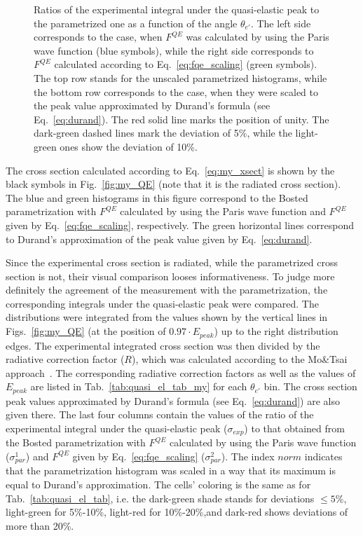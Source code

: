 \begin{figure}[htp]
\begin{center}
\begin{framed}
\end{framed}
\caption{\small Ratios of the experimental integral under the quasi-elastic peak to the parametrized one as a function of the angle $\theta_{e'}$. The left side corresponds to the case, when $F^{QE}$ was calculated by using the Paris wave function (blue symbols), while the right side corresponds to $F^{QE}$ calculated according to Eq.~\eqref{eq:fqe_scaling} (green symbols). The top row stands for the unscaled parametrized histograms, while the bottom row corresponds to the case, when they were scaled to the peak value approximated by Durand's formula (see Eq.~\eqref{eq:durand}). The red solid line marks the position of unity. The dark-green dashed lines mark the deviation of 5\%, while the light-green ones show the deviation of 10\%.} \label{fig:my_ratio}
\end{center}
\end{figure}

The cross section calculated according to Eq.~\eqref{eq:my_xsect} is shown by the black symbols in Fig.~\ref{fig:my_QE} (note that it is the radiated cross section). The blue and green histograms in this figure correspond to the Bosted parametrization with  $F^{QE}$ calculated by using the Paris wave function and $F^{QE}$ given by Eq.~\eqref{eq:fqe_scaling}, respectively. The green horizontal lines correspond to Durand's approximation of the peak value given by Eq.~\eqref{eq:durand}.  

Since the experimental cross section is radiated, while the parametrized cross section is not, their visual comparison looses informativeness. To judge more definitely the agreement of the measurement with the parametrization, the corresponding integrals under the quasi-elastic peak were compared. The distributions were integrated from the values shown by the vertical lines in Figs.~\ref{fig:my_QE} (at the position of $0.97\cdot E_{peak}$) up to the right distribution edges. The experimental integrated cross section was then divided by the radiative correction factor ($R$), which was calculated according to the Mo\&Tsai approach~\cite{Mo:1968cg}. The corresponding radiative correction factors as well as the values of $E_{peak}$ are listed in Tab.~\ref{tab:quasi_el_tab_my} for each $\theta_{e'}$ bin. The cross section peak values approximated by Durand's formula (see Eq.~\eqref{eq:durand}) are also given there. The last four columns contain the values of the ratio of the experimental integral under the quasi-elastic peak ($\sigma_{exp}$) to that obtained from the Bosted parametrization with $F^{QE}$ calculated by using the Paris wave function ($\sigma_{par}^{1}$) and $F^{QE}$ given by Eq.~\eqref{eq:fqe_scaling} ($\sigma_{par}^{2}$). The index $norm$ indicates that the parametrization histogram was scaled in a way that its maximum is equal to Durand's approximation. The cells' coloring is the same as for Tab.~\ref{tab:quasi_el_tab}, i.e. the dark-green shade stands for deviations $\leq 5$\%, light-green for 5\%-10\%, light-red for 10\%-20\%,and dark-red shows deviations of more than 20\%.


